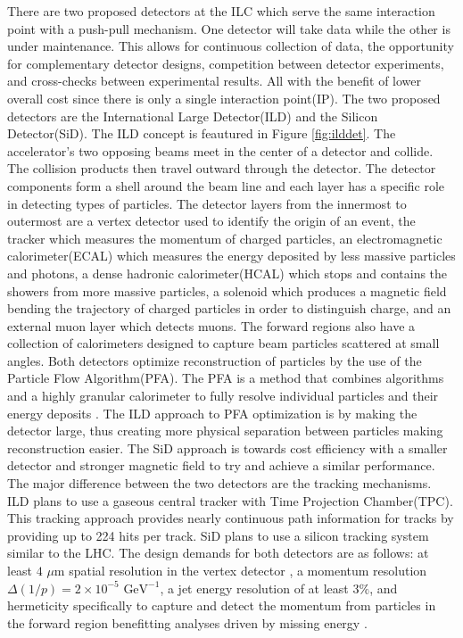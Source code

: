 There are two proposed detectors at the ILC which serve the same interaction point with a push-pull mechanism. One detector will take data while the other is under maintenance. This allows for continuous collection of data, the opportunity for complementary detector designs, competition between detector experiments, and cross-checks between experimental results. All with the benefit of lower overall cost since there is only a single interaction point(IP). The two proposed detectors are the International Large Detector(ILD) and the Silicon Detector(SiD). The ILD concept is feautured in Figure \ref{fig:ilddet}. The accelerator's two opposing beams meet in the center of a detector and collide. The collision products then travel outward through the detector.  The detector components form a shell around the beam line and each layer has a specific role in detecting types of particles. The detector layers from the innermost to outermost are a vertex detector used to identify the origin of an event, the tracker  which measures the momentum of charged particles, an electromagnetic calorimeter(ECAL) which measures the energy deposited by less massive particles and photons, a dense hadronic calorimeter(HCAL) which stops and contains the showers from more massive particles,  a solenoid which produces a magnetic field bending the trajectory of charged particles in order to distinguish charge, and an external muon layer which detects muons. The forward regions also have a collection of calorimeters designed to capture beam particles scattered at small angles. Both detectors optimize reconstruction of particles by the use of the Particle Flow Algorithm(PFA). The PFA is a method that combines algorithms and a highly granular calorimeter to fully resolve individual particles and their energy deposits \cite{pfa}.
The ILD approach to PFA optimization is by making the detector large, thus creating more physical separation between particles making reconstruction easier. The SiD approach is towards cost efficiency with a smaller detector and stronger magnetic field to try and achieve a similar performance. 
The major difference between the two detectors are the tracking mechanisms.   ILD plans to use a gaseous central tracker with Time Projection Chamber(TPC). This tracking approach provides nearly continuous path information for tracks by providing up to 224 hits per track. SiD plans to use a silicon tracking system similar to the LHC. The design demands for both detectors are as follows: at least $4 \, \, \mu$m spatial resolution in the vertex detector , a momentum resolution $\Delta (1/p) =  2 \times  10^{-5} \, \, \text{GeV}^{-1}$, a jet energy resolution of at least $3\%$, and hermeticity specifically to capture and detect the momentum from particles in the forward region benefitting analyses driven by missing energy \cite{currdetector}.

